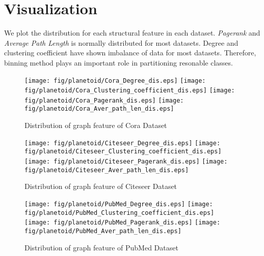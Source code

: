 \documentclass[runningheads]{llncs}
\begin{document}
\section{Visualization}
We plot the distribution for each structural feature in each dataset. \textit{Pagerank} and \textit{Average Path Length} is normally distributed for most datasets. Degree and clustering coefficient have shown imbalance of data for most datasets. Therefore, binning method plays an important role in partitioning resonable classes.
  \begin{figure}
    \centering
    \begin{center}
     \hspace*{-1.5in}
        \texttt{[image: fig/planetoid/Cora\_Degree\_dis.eps]}
        \texttt{[image: fig/planetoid/Cora\_Clustering\_coefficient\_dis.eps]}
        \texttt{[image: fig/planetoid/Cora\_Pagerank\_dis.eps]}
        \texttt{[image: fig/planetoid/Cora\_Aver\_path\_len\_dis.eps]}
        \hspace*{-1.5in}
        \caption{Distribution of graph feature of Cora Dataset}
    \end{center}
      \centering
      \begin{center}
       \hspace*{-1.5in}
          \texttt{[image: fig/planetoid/Citeseer\_Degree\_dis.eps]}
          \texttt{[image: fig/planetoid/Citeseer\_Clustering\_coefficient\_dis.eps]}
          \texttt{[image: fig/planetoid/Citeseer\_Pagerank\_dis.eps]}
          \texttt{[image: fig/planetoid/Citeseer\_Aver\_path\_len\_dis.eps]}
          \hspace*{-1.5in}
          \caption{Distribution of graph feature of Citeseer Dataset}
      \end{center}

        \centering
        \begin{center}
         \hspace*{-1.5in}
            \texttt{[image: fig/planetoid/PubMed\_Degree\_dis.eps]}
            \texttt{[image: fig/planetoid/PubMed\_Clustering\_coefficient\_dis.eps]}
            \texttt{[image: fig/planetoid/PubMed\_Pagerank\_dis.eps]}
            \texttt{[image: fig/planetoid/PubMed\_Aver\_path\_len\_dis.eps]}
            \hspace*{-1.5in}
            \caption{Distribution of graph feature of PubMed Dataset}
        \end{center}


\end{figure}
\end{document}
